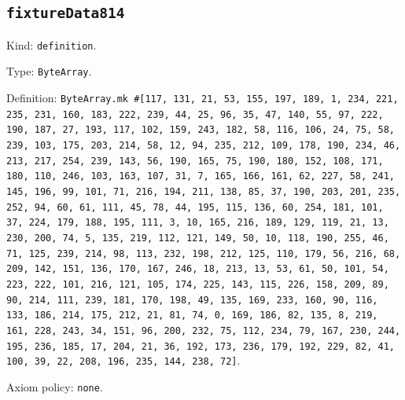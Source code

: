 \documentclass[11pt]{article}
\begin{document}
\subsection*{\texttt{fixtureData814}}
\noindent Kind: \texttt{definition}.\par
\noindent Type: \texttt{ByteArray}.\par
\noindent Definition: \texttt{ByteArray.mk \#[117, 131, 21, 53, 155, 197, 189, 1, 234, 221, 235, 231, 160, 183, 222, 239, 44, 25, 96, 35, 47, 140, 55, 97, 222, 190, 187, 27, 193, 117, 102, 159, 243, 182, 58, 116, 106, 24, 75, 58, 239, 103, 175, 203, 214, 58, 12, 94, 235, 212, 109, 178, 190, 234, 46, 213, 217, 254, 239, 143, 56, 190, 165, 75, 190, 180, 152, 108, 171, 180, 110, 246, 103, 163, 107, 31, 7, 165, 166, 161, 62, 227, 58, 241, 145, 196, 99, 101, 71, 216, 194, 211, 138, 85, 37, 190, 203, 201, 235, 252, 94, 60, 61, 111, 45, 78, 44, 195, 115, 136, 60, 254, 181, 101, 37, 224, 179, 188, 195, 111, 3, 10, 165, 216, 189, 129, 119, 21, 13, 230, 200, 74, 5, 135, 219, 112, 121, 149, 50, 10, 118, 190, 255, 46, 71, 125, 239, 214, 98, 113, 232, 198, 212, 125, 110, 179, 56, 216, 68, 209, 142, 151, 136, 170, 167, 246, 18, 213, 13, 53, 61, 50, 101, 54, 223, 222, 101, 216, 121, 105, 174, 225, 143, 115, 226, 158, 209, 89, 90, 214, 111, 239, 181, 170, 198, 49, 135, 169, 233, 160, 90, 116, 133, 186, 214, 175, 212, 21, 81, 74, 0, 169, 186, 82, 135, 8, 219, 161, 228, 243, 34, 151, 96, 200, 232, 75, 112, 234, 79, 167, 230, 244, 195, 236, 185, 17, 204, 21, 36, 192, 173, 236, 179, 192, 229, 82, 41, 100, 39, 22, 208, 196, 235, 144, 238, 72]}.\par
\noindent Axiom policy: \texttt{none}.\par
\end{document}
